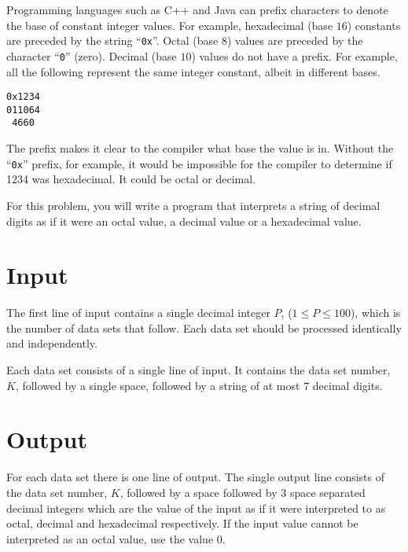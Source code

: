 
Programming languages such as C++ and Java can prefix characters to denote the base of constant
integer values. For example, hexadecimal (base $16$) constants are preceded by the string ``\texttt{0x}''. 
Octal (base $8$) values are preceded by the character ``\texttt{0}'' (zero). Decimal (base $10$) values 
do not have a prefix. For example, all the following represent the same integer constant, albeit 
in different bases.

\begin{center}
\begin{verbatim}
0x1234
011064
 4660
\end{verbatim}
\end{center}

The prefix makes it clear to the compiler what base the value is in. Without the ``\texttt{0x}'' prefix, for
example, it would be impossible for the compiler to determine if 1234 was hexadecimal. 
It could be octal or decimal.

For this problem, you will write a program that interprets a string of decimal digits as if it were an octal
value, a decimal value or a hexadecimal value.

\section*{Input}

The first line of input contains a single decimal integer $P$, ($1 \le P \le 100$), which is the number of
data sets that follow. Each data set should be processed identically and independently.

Each data set consists of a single line of input. It contains the data set number, $K$, followed by a
single space, followed by a string of at most $7$ decimal digits.

\section*{Output}

For each data set there is one line of output. The single output line consists of the data set number,
$K$, followed by a space followed by $3$ space separated decimal integers which are the value of the
input as if it were interpreted to as octal, decimal and hexadecimal respectively. If the input value
cannot be interpreted as an octal value, use the value $0$.

